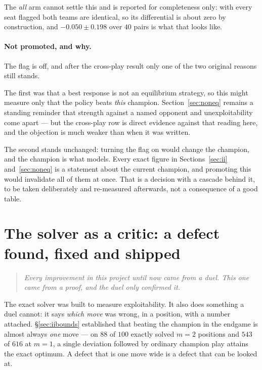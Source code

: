 \documentclass[11pt,a4paper]{article}
\begin{document}
The \emph{all} arm cannot settle this and is reported for completeness only:
with every seat flagged both teams are identical, so its differential is about
zero by construction, and $-0.050 \pm 0.198$ over $40$ pairs is what that looks
like.

\paragraph{Not promoted, and why.} The flag is off, and after the cross-play
result only one of the two original reasons still stands.

The first was that a best response is not an equilibrium strategy, so this
might measure only that the policy beats \emph{this} champion.
Section~\ref{sec:noneq} remains a standing reminder that strength against a
named opponent and unexploitability come apart --- but the cross-play row is
direct evidence against that reading here, and the objection is much weaker
than when it was written.

The second stands unchanged: turning the flag on would change the champion, and
the champion is what  models. Every exact figure in
Sections~\ref{sec:ii} and~\ref{sec:noneq} is a statement about the current
champion, and promoting this would invalidate all of them at once. That is a
decision with a cascade behind it, to be taken deliberately and re-measured
afterwards, not a consequence of a good table.

\section{The solver as a critic: a defect found, fixed and shipped}
\label{sec:critic}

\begin{quote}
\emph{Every improvement in this project until now came from a duel. This one
came from a proof, and the duel only confirmed it.}
\end{quote}

The exact solver was built to measure exploitability. It also does something a
duel cannot: it says \emph{which move} was wrong, in a position, with a number
attached. \S\ref{sec:iibounds} established that beating the champion in the
endgame is almost always \emph{one} move --- on $88$ of $100$ exactly solved
$m = 2$ positions and $543$ of $616$ at $m = 1$, a single deviation followed by
ordinary champion play attains the exact optimum. A defect that is one move
wide is a defect that can be looked at.
\end{document}

